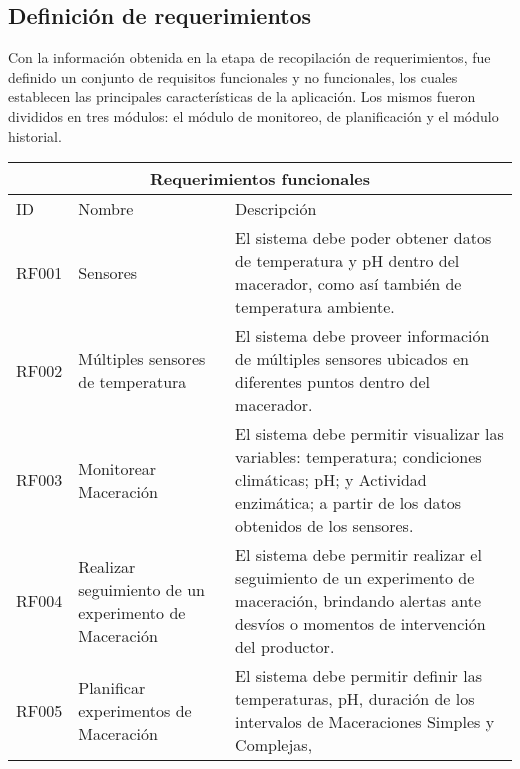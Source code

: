     \subsection{Definición de requerimientos}
    \par
    Con la información obtenida en la etapa de recopilación de requerimientos, fue definido un conjunto de requisitos funcionales y no funcionales, los cuales establecen las principales características de la aplicación. Los mismos fueron divididos en tres módulos: el módulo de monitoreo, de planificación y el módulo historial.
    
  \begin{table}[H]
   \begin{center}
   \begin{tabularx}{\textwidth}{| X | X | X |}
   \hline
   \multicolumn{3}{|c|}{\textbf{Requerimientos funcionales}} \\
   \hline
    ID & Nombre & Descripción \\
   \hline
   \hline
        RF001 & Sensores & El sistema debe poder obtener datos de temperatura y pH dentro del macerador, como así también de temperatura ambiente.
        \\\hline
        RF002 & Múltiples sensores de temperatura  & El sistema debe proveer información de múltiples sensores ubicados en diferentes puntos dentro del macerador.
        \\\hline
        RF003 & Monitorear Maceración & El sistema debe permitir visualizar las variables: temperatura; condiciones climáticas; pH; y Actividad enzimática; a partir de los datos obtenidos de los sensores.
        \\\hline
        RF004 & Realizar seguimiento de un experimento de Maceración & El sistema debe permitir realizar el seguimiento de un experimento de maceración, brindando alertas ante desvíos o momentos de intervención del productor. \\\hline
        RF005 &  Planificar experimentos de Maceración & El sistema debe permitir definir las temperaturas, pH, duración de los intervalos de Maceraciones Simples y Complejas,
        \\\hline
        
    \end{tabularx}
    \label{ReqFuncionales_Parte1}
    \end{center}
    \end{table}
    
